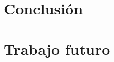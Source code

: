 \documentclass[a4paper, 10pt, twoside]{article}
\begin{document}


\section{Conclusión}






\section{Trabajo futuro}




\begin{thebibliography}{9}


\end{thebibliography}
\end{document}
